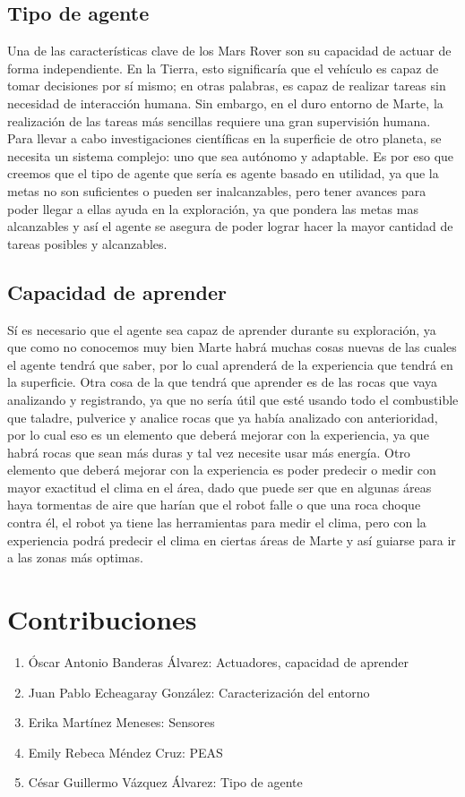 \documentclass{article}
\begin{document}
        \subsection{Tipo de agente}
            Una de las características clave de los Mars Rover son su capacidad de actuar de forma independiente. En la Tierra, esto significaría que el vehículo es capaz de tomar decisiones por sí mismo; en otras palabras, es capaz de realizar tareas sin necesidad de interacción humana. Sin embargo, en el duro entorno de Marte, la realización de las tareas más sencillas requiere una gran supervisión humana. Para llevar a cabo investigaciones científicas en la superficie de otro planeta, se necesita un sistema complejo: uno que sea autónomo y adaptable. Es por eso que creemos que el tipo de agente que sería es agente basado en utilidad, ya que la metas no son suficientes o pueden ser inalcanzables, pero tener avances para poder llegar a ellas ayuda en la exploración, ya que pondera las metas mas alcanzables y así el agente se asegura de poder lograr hacer la mayor cantidad de tareas posibles y alcanzables.

        \subsection{Capacidad de aprender}
            Sí es necesario que el agente sea capaz de aprender durante su exploración, ya que como no conocemos muy bien Marte habrá muchas cosas nuevas de las cuales el agente tendrá que saber, por lo cual aprenderá de la experiencia que tendrá en la superficie. Otra cosa de la que tendrá que aprender es de las rocas que vaya analizando y registrando, ya que no sería útil que esté usando todo el combustible que taladre, pulverice y analice rocas que ya había analizado con anterioridad, por lo cual eso es un elemento que deberá mejorar con la experiencia, ya que habrá rocas que sean más duras y tal vez necesite usar más energía. Otro elemento que deberá mejorar con la experiencia es poder predecir o medir con mayor exactitud el clima en el área, dado que puede ser que en algunas áreas haya tormentas de aire que harían que el robot falle o que una roca choque contra él, el robot ya tiene las herramientas para medir el clima, pero con la experiencia podrá predecir el clima en ciertas áreas de Marte y así guiarse para ir a las zonas más optimas. 
    \section{Contribuciones}
        \begin{enumerate}
            \item Óscar Antonio Banderas Álvarez: Actuadores, capacidad de aprender
            \item Juan Pablo Echeagaray González: Caracterización del entorno
            \item Erika Martínez Meneses: Sensores
            \item Emily Rebeca Méndez Cruz: PEAS
            \item César Guillermo Vázquez Álvarez: Tipo de agente
        \end{enumerate}
\end{document}
